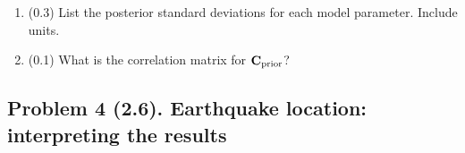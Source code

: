\documentclass[11pt,titlepage,fleqn]{article}
\begin{document}
\begin{enumerate}
\begin{enumerate}
\item (0.3) List the posterior standard deviations for each model parameter. Include units.

\item (0.1) What is the correlation matrix for $\mbox{${\bf C}$}_{\rm prior}$?
\end{enumerate}

\end{enumerate}


\pagebreak
\subsection*{Problem 4 (2.6). Earthquake location: interpreting the results}
\end{document}

